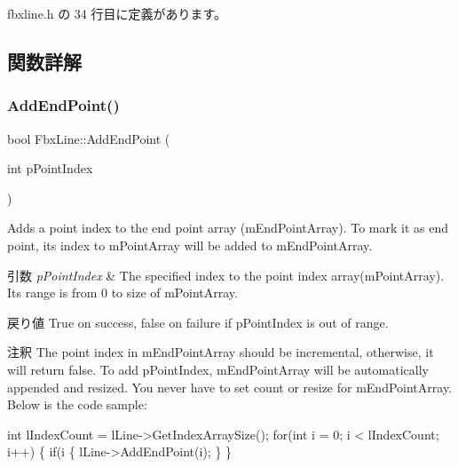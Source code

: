  fbxline.\+h の 34 行目に定義があります。



\subsection{関数詳解}
\mbox{\label{class_fbx_line_ad648323a73b0b4f1bf9cfae2fdb65e23}} 
\subsubsection{\texorpdfstring{Add\+End\+Point()}{AddEndPoint()}}
{\footnotesize\ttfamily bool Fbx\+Line\+::\+Add\+End\+Point (\begin{DoxyParamCaption}\item[{int}]{p\+Point\+Index }\end{DoxyParamCaption})}

Adds a point index to the end point array (m\+End\+Point\+Array). To mark it as end point, its index to m\+Point\+Array will be added to m\+End\+Point\+Array. 
\begin{DoxyParams}{引数}
{\em p\+Point\+Index} & The specified index to the point index array(m\+Point\+Array). Its range is from 0 to size of m\+Point\+Array. \\
\hline
\end{DoxyParams}
\begin{DoxyReturn}{戻り値}
True on success, false on failure if p\+Point\+Index is out of range. 
\end{DoxyReturn}
\begin{DoxyRemark}{注釈}
The point index in m\+End\+Point\+Array should be incremental, otherwise, it will return false. To add p\+Point\+Index, m\+End\+Point\+Array will be automatically appended and resized. You never have to set count or resize for m\+End\+Point\+Array. Below is the code sample\+: 
\begin{DoxyCode}
\textcolor{keywordtype}{int} lIndexCount = lLine->GetIndexArraySize();
\textcolor{keywordflow}{for}(\textcolor{keywordtype}{int} i = 0; i < lIndexCount; i++)
\{
    \textcolor{keywordflow}{if}(i%
    \{
        lLine->AddEndPoint(i);
    \}
\}
\end{DoxyCode}
 
\end{DoxyRemark}
\mbox{\label{class_fbx_line_a0829ee40fdecef0b749c3b026744c31a}} 
